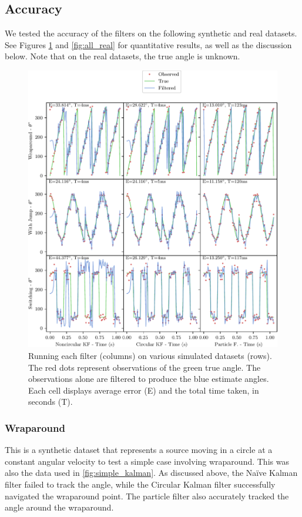 \documentclass[11pt]{amsart}
\begin{document}
\subsection{Accuracy}
We tested the accuracy of the filters on the following synthetic and real datasets. See Figures \ref{fig:all_simulated} and \ref{fig:all_real} for quantitative results, as well as the discussion below. Note that on the real datasets, the true angle is unknown.
\begin{figure}[htp]
    \centering
    \includegraphics[width=.95\textwidth]{actual_paper_graphs/all_simulated.pdf}\hfill
    \caption{
        Running each filter (columns) on various simulated datasets (rows).
        The red dots represent observations of the green true angle. 
        The observations alone are filtered to produce the blue estimate angles.
        Each cell displays average error (E) and the total time taken, in seconds (T).
        }
    \label{fig:all_simulated}
\end{figure}

\subsubsection{Wraparound}
This is a synthetic dataset that represents a source moving in a circle at a constant angular velocity to test a simple case involving wraparound. This was also the data used in \ref{fig:simple_kalman}. As discussed above, the Naïve Kalman filter failed to track the angle, while the Circular Kalman filter successfully navigated the wraparound point. The particle filter also accurately tracked the angle around the wraparound.
\end{document}
